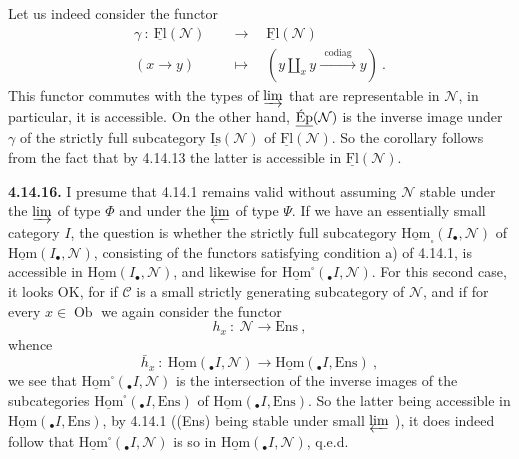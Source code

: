 \documentclass[11pt]{article}
\newcommand{\printedpage}[1]{\marginpar{\footnotesize p.~#1}}
\newcommand{\msp}[1]{\marginpar{\footnotesize [#1]}}
\newcommand{\uHom}{\underline{\mathrm{Hom}}}
\newcommand{\uFl}{\underline{\mathrm{Fl}}}
\newcommand{\uIs}{\underline{\mathrm{Is}}}
\newcommand{\uEp}{\underline{\textup{Ép}}}
\newcommand{\Ob}{\operatorname{Ob}}
\newcommand{\Ens}{\mathrm{Ens}}
\begin{document}
\printedpage{147}

\msp{page 388}
Let us indeed consider the functor
\[
\begin{aligned}
\gamma \ : \ \uFl(\mathcal{N}) \quad &\longrightarrow \quad \uFl(\mathcal{N}) \\
(x \longrightarrow y) \quad &\longmapsto \quad (y \amalg_x y \xrightarrow{\ \ \text{codiag}\ \ } y) \ .
\end{aligned}
\]
This functor commutes with the types of $\varinjlim$ that are representable in $\mathcal{N}$, in particular, it is accessible. On the other hand, $\uEp(\mathcal{N})$ is the inverse image under $\gamma$ of the strictly full subcategory $\uIs(\mathcal{N})$ of $\uFl(\mathcal{N})$. So the corollary follows from the fact that by 4.14.13 the latter is accessible in $\uFl(\mathcal{N})$.

\textbf{4.14.16.} I presume that 4.14.1 remains valid without assuming $\mathcal{N}$ stable under the $\varinjlim$ of type $\Phi$ and under the $\varprojlim$ of type $\Psi$. If we have an essentially small category $I$, the question is whether the strictly full subcategory $\uHom_{\square}(I_\bullet,\mathcal{N})$ of $\uHom(I_\bullet,\mathcal{N})$, consisting of the functors satisfying
\msp{page 389}
condition a) of 4.14.1, is accessible in $\uHom(I_\bullet,\mathcal{N})$, and likewise for $\uHom^{\square}({}_\bullet I,\mathcal{N})$. For this second case, it looks OK, for if $\mathcal{C}$ is a small strictly generating subcategory of $\mathcal{N}$, and if for every $x \in \Ob$ we again consider the functor
\[
h_x \ : \ \mathcal{N} \longrightarrow \Ens \ ,
\]
whence
\[
\bar{h}_x \ : \ \uHom({}_\bullet I,\mathcal{N}) \longrightarrow \uHom({}_\bullet I,\Ens) \ ,
\]
we see that $\uHom^{\square}({}_\bullet I,\mathcal{N})$ is the intersection of the inverse images of the subcategories $\uHom^{\square}({}_\bullet I,\Ens)$ of $\uHom({}_\bullet I,\Ens)$. So the latter being accessible in $\uHom({}_\bullet I,\Ens)$, by 4.14.1 ((Ens) being stable under small $\varprojlim$ ), it does indeed follow that $\uHom^{\square}({}_\bullet I,\mathcal{N})$ is so in $\uHom({}_\bullet I,\mathcal{N})$, q.e.d.
\end{document}
